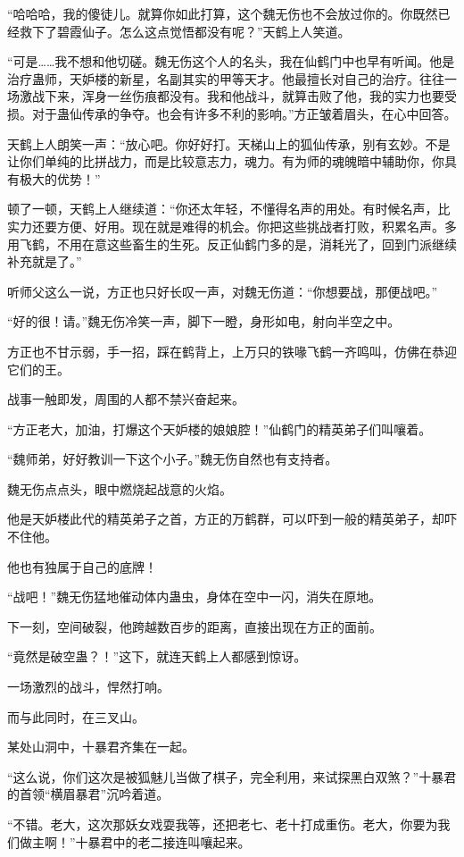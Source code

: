 \begin{this_body}
“哈哈哈，我的傻徒儿。就算你如此打算，这个魏无伤也不会放过你的。你既然已经救下了碧霞仙子。怎么这点觉悟都没有呢？”天鹤上人笑道。

“可是……我不想和他切磋。魏无伤这个人的名头，我在仙鹤门中也早有听闻。他是治疗蛊师，天妒楼的新星，名副其实的甲等天才。他最擅长对自己的治疗。往往一场激战下来，浑身一丝伤痕都没有。我和他战斗，就算击败了他，我的实力也要受损。对于蛊仙传承的争夺。也会有许多不利的影响。”方正皱着眉头，在心中回答。

天鹤上人朗笑一声：“放心吧。你好好打。天梯山上的狐仙传承，别有玄妙。不是让你们单纯的比拼战力，而是比较意志力，魂力。有为师的魂魄暗中辅助你，你具有极大的优势！”

顿了一顿，天鹤上人继续道：“你还太年轻，不懂得名声的用处。有时候名声，比实力还要方便、好用。现在就是难得的机会。你把这些挑战者打败，积累名声。多用飞鹤，不用在意这些畜生的生死。反正仙鹤门多的是，消耗光了，回到门派继续补充就是了。”

听师父这么一说，方正也只好长叹一声，对魏无伤道：“你想要战，那便战吧。”

“好的很！请。”魏无伤冷笑一声，脚下一瞪，身形如电，射向半空之中。

方正也不甘示弱，手一招，踩在鹤背上，上万只的铁喙飞鹤一齐鸣叫，仿佛在恭迎它们的王。

战事一触即发，周围的人都不禁兴奋起来。

“方正老大，加油，打爆这个天妒楼的娘娘腔！”仙鹤门的精英弟子们叫嚷着。

“魏师弟，好好教训一下这个小子。”魏无伤自然也有支持者。

魏无伤点点头，眼中燃烧起战意的火焰。

他是天妒楼此代的精英弟子之首，方正的万鹤群，可以吓到一般的精英弟子，却吓不住他。

他也有独属于自己的底牌！

“战吧！”魏无伤猛地催动体内蛊虫，身体在空中一闪，消失在原地。

下一刻，空间破裂，他跨越数百步的距离，直接出现在方正的面前。

“竟然是破空蛊？！”这下，就连天鹤上人都感到惊讶。

一场激烈的战斗，悍然打响。

而与此同时，在三叉山。

某处山洞中，十暴君齐集在一起。

“这么说，你们这次是被狐魅儿当做了棋子，完全利用，来试探黑白双煞？”十暴君的首领“横眉暴君”沉吟着道。

“不错。老大，这次那妖女戏耍我等，还把老七、老十打成重伤。老大，你要为我们做主啊！”十暴君中的老二接连叫嚷起来。


\end{this_body}
